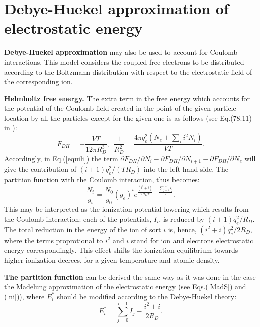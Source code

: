 \section{Debye-Huekel approximation of electrostatic energy}
{\bf Debye-Huekel approximation} may also be used to account for Coulomb interactions.
This model considers the coupled free electrons to be distributed according to
the Boltzmann distribution with respect to the electrostatic field of the corresponding ion.

{\bf Helmholtz free energy.} The extra term in the free energy which accounts for the
potential of the Coulomb field created in the point of the given particle location
by all the particles except for the given one is as follows (see Eq.(78.11) in \cite{ll}):
\begin{equation}\label{DH}
F_{DH}=-\frac{VT}{12\pi R_D^3},\,\,\,\frac1{R_D^2} = \frac{4\pi q_e^2(N_e+\sum_i{i^2N_i})}{VT}.
\end{equation}
Accordingly, in Eq.(\ref{equili}) the term $\partial F_{DH}/\partial N_i -\partial F_{DH}/\partial N_{i+1}-\partial F_{DH}/\partial N_e$ will 
give the contribution of $(i+1)q^2_e/(TR_D)$ into the left hand side. The partition function with the Coulomb interaction, thus becomes:
\begin{equation}\label{pfDH}
\frac{N_{i}}{g_{i}}=\frac{N_0}{g_0}(g_e)^ie^{\frac{(i^2+i)}{2R_DT}-\frac{\sum_{j=0}^{i-1}I_j}T}.
\end{equation}
This may be interpreted as the ionization potential lowering which results from the Coulomb interaction: each of the potentials, $I_i$, is reduced
by $(i+1)q_e^2/R_D$. The total reduction in the energy of the ion of sort $i$ is, hence, $(i^2+i)q_e^2/2R_D$, where the terms proprotional to $i^2$ and $i$ 
stand for ion and electrons electrostatic energy correspondingly. This effect shifts the ionization equilibrium towards higher ionization decrees, for a given 
temperature and atomic density. 

{\bf The partition function} can be derived the same way as it was done in the case the Madelung approximation of the electrostatic energy
(see Eqs.(\ref{MadS}) and (\ref{ni})), where $E^*_i$ should be modified according to the Debye-Huekel theory:
\begin{equation}
E^*_i = \sum_{j=0}^{i-1}{I_j} - \frac{i^2+i}{2 R_D}.
\end{equation}


